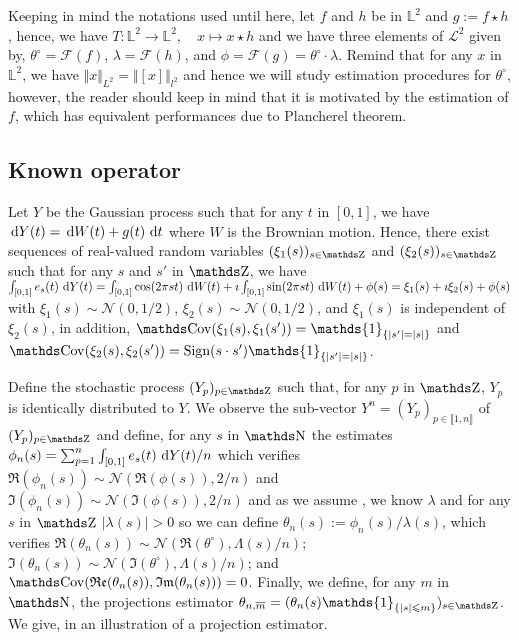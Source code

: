 \medskip

Keeping in mind the notations used until here, let $f$ and $h$ be in $\mathds{L}^{2}$ and $g := f \star h$, hence, we have $T : \mathds{L}^{2} \to \mathds{L}^{2}, \quad x \mapsto x \star h$ and we have three elements of $\mathcal{L}^{2}$ given by, $\theta^{\circ} = \mathcal{F}(f)$, $\lambda = \mathcal{F}(h)$, and $\phi = \mathcal{F}(g) = \theta^{\circ} \cdot \lambda$.
Remind that for any $x$ in $\mathds{L}^{2}$, we have $\Vert x \Vert_{L^{2}} = \Vert [x] \Vert_{l^{2}}$ and hence we will study estimation procedures for $\theta^{\circ}$, however, the reader should keep in mind that it is motivated by the estimation of $f$, which has equivalent performances due to Plancherel theorem.

\subsection{Known operator}
Let $Y$ be the Gaussian process such that for any $t$ in $[0, 1]$, we have $\operatorname{\, d \!} Y(t) = \operatorname{\, d \!} W(t) + g(t) \operatorname{\, d \!} t$ where $W$ is the Brownian motion.
Hence, there exist sequences of real-valued random variables $(\xi_{1}(s))_{s \in \Z}$ and $(\xi_{2}(s))_{s \in \Z}$ such that for any $s$ and $s'$ in $\Z$, we have $\int_{[0, 1]} e_{s}(t) \operatorname{\, d \!} Y(t) = \int_{[0, 1]} \cos(2 \pi s t) \operatorname{\, d \!} W(t) + \imath \int_{[0, 1]} \sin(2 \pi s t) \operatorname{\, d \!} W(t) + \phi(s) = \xi_{1}(s) + \imath \xi_{2}(s) + \phi(s)$ with $\xi_{1}(s) \sim \mathcal{N}(0, 1/2)$, $\xi_{2}(s) \sim \mathcal{N}(0, 1/2)$, and $\xi_{1}(s)$ is independent of $\xi_{2}(s)$, in addition, $\Cov(\xi_{1}(s), \xi_{1}(s')) = \mathds{1}_{\{\vert s' \vert = \vert s \vert\}}$ and $\Cov(\xi_{2}(s), \xi_{2}(s')) = \text{Sign}(s \cdot s') \mathds{1}_{\{\vert s' \vert = \vert s \vert\}}$.

\medskip

Define the \iid stochastic process $(Y_{p})_{p \in \Z}$ such that, for any $p$ in $\Z$, $Y_{p}$ is identically distributed to $Y$.
We observe the sub-vector $Y^{n} = (Y_{p})_{p \in \llbracket 1, n \rrbracket}$ of $(Y_{p})_{p \in \Z}$ and define, for any $s$ in $\N$ the estimates $\phi_{n}(s) = \sum_{p = 1}^{n} \int_{[0, 1]} e_{s}(t) \operatorname{\, d \!} Y(t) / n$ which verifies $\Re(\phi_{n}(s)) \sim \mathcal{N}(\Re(\phi(s)), 2/n)$ and $\Im(\phi_{n}(s)) \sim \mathcal{N}(\Im(\phi(s)), 2/n)$ and as we assume , we know $\lambda$ and for any $s$ in $\Z$ $\vert \lambda(s) \vert > 0$ so we can define $\theta_{n}(s) := \phi_{n}(s) / \lambda(s)$, which verifies $\Re(\theta_{n}(s)) \sim \mathcal{N}(\Re(\theta^{\circ}), \Lambda(s)/n)$; $\Im(\theta_{n}(s)) \sim \mathcal{N}(\Im(\theta^{\circ}), \Lambda(s)/n)$; and $\Cov(\Re(\theta_{n}(s)), \Im(\theta_{n}(s))) = 0$.
Finally, we define, for any $m$ in $\N$, the projections estimator $\theta_{n, \overline{m}} = (\theta_{n}(s) \mathds{1}_{\{\vert s \vert \leq m\}})_{s \in \Z}$.
We give, in  an illustration of a projection estimator.

